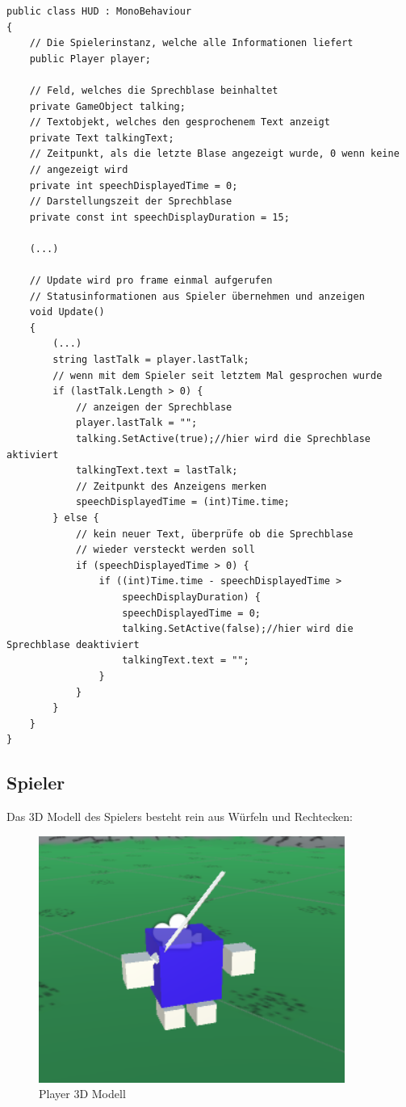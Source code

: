 \begin{lstlisting}[caption={Sprechblase ein- und ausblenden}]
public class HUD : MonoBehaviour
{
	// Die Spielerinstanz, welche alle Informationen liefert
	public Player player;

	// Feld, welches die Sprechblase beinhaltet
	private GameObject talking;
	// Textobjekt, welches den gesprochenem Text anzeigt
	private Text talkingText;
	// Zeitpunkt, als die letzte Blase angezeigt wurde, 0 wenn keine 
	// angezeigt wird
	private int speechDisplayedTime = 0;
	// Darstellungszeit der Sprechblase
	private const int speechDisplayDuration = 15;

	(...)
	
	// Update wird pro frame einmal aufgerufen
	// Statusinformationen aus Spieler übernehmen und anzeigen
	void Update()
	{
		(...)
		string lastTalk = player.lastTalk;
		// wenn mit dem Spieler seit letztem Mal gesprochen wurde
		if (lastTalk.Length > 0) {
			// anzeigen der Sprechblase
			player.lastTalk = "";
			talking.SetActive(true);//hier wird die Sprechblase aktiviert
			talkingText.text = lastTalk;
			// Zeitpunkt des Anzeigens merken
			speechDisplayedTime = (int)Time.time;
		} else {
			// kein neuer Text, überprüfe ob die Sprechblase 
			// wieder versteckt werden soll
			if (speechDisplayedTime > 0) {
				if ((int)Time.time - speechDisplayedTime > 
					speechDisplayDuration) {
					speechDisplayedTime = 0;
					talking.SetActive(false);//hier wird die Sprechblase deaktiviert
					talkingText.text = "";
				}
			}
		}	
	}
}
\end{lstlisting}

\subsection{Spieler}

Das 3D Modell des Spielers besteht rein aus Würfeln und Rechtecken:

\begin{figure}[H]
\includegraphics[scale=1]{screenshots/player.png}
\caption{Player 3D Modell}
\end{figure}

